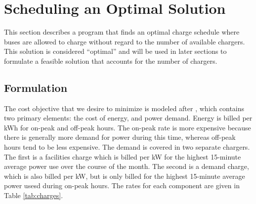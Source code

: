 \section{Scheduling an Optimal Solution}
This section describes a program that finds an optimal charge schedule where buses are allowed to charge without regard to the number of available chargers. This solution is considered ``optimal'' and will be used in later sections to formulate a feasible solution that accounts for the number of chargers.
 

 
\subsection{Formulation\label{sec:formulation}} 
The cost objective that we desire to minimize is modeled after \cite{rocky_mountain_power_rocky_2021}, which contains two primary elements: the cost of energy, and power demand. Energy is billed per kWh for on-peak and off-peak hours. The on-peak rate is more expensive because there is generally more demand for power during this time, whereas off-peak hours tend to be less expensive. The demand is covered in two separate chargers.  The first is a facilities charge which is billed per kW for the highest 15-minute average power use over the course of the month. The second is a demand charge, which is also billed per kW, but is only billed for the highest 15-minute average power usesd during on-peak hours. The rates for each component are given in Table \ref{tab:charges}.  

